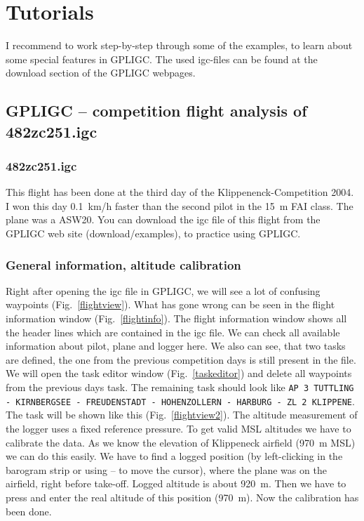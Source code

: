 \section{Tutorials}

I recommend to work step-by-step through some of the examples, to learn about some special features in GPLIGC.
The used igc-files can be found at the download section of the GPLIGC webpages.

\subsection{GPLIGC -- competition flight analysis  of 482zc251.igc}

\subsubsection{482zc251.igc}
This flight has been done at the third day of the Klippenenck-Competition 2004.
I won this day 0.1~km/h faster than the second pilot in the 15~m FAI class. The plane was a ASW20.
You can download the igc file of this flight from the GPLIGC web site (download/examples), to practice using GPLIGC.

\subsubsection{General information, altitude calibration}
Right after opening the igc file in GPLIGC, we will see a lot of confusing waypoints (Fig.~\ref{flightview}).
What has gone wrong can be seen in the flight information window (Fig.~\ref{flightinfo}).
The flight information window shows all the header lines which are contained in the igc file.
We can check all available information about pilot, plane and logger here.
We also can see, that two tasks are defined, the one from the previous competition days is still present in the file.
We will open the task editor window (Fig.~\ref{taskeditor}) and delete all waypoints from the previous days task.
The remaining task should look like \texttt{AP 3 TUTTLING - KIRNBERGSEE - FREUDENSTADT - HOHENZOLLERN - HARBURG - ZL 2 KLIPPENE}.
The task will be shown like this (Fig.~\ref{flightview2}).
The altitude measurement of the logger uses a fixed reference pressure.
To get valid MSL altitudes we have to calibrate the data.
As we know the elevation of Klippeneck airfield (970~m MSL) we can do this easily.
We have to find a logged position (by left-clicking in the barogram strip or using -- to move the cursor),
where the plane was on the airfield, right before take-off. Logged altitude is about 920~m.
Then we have to press  and enter the real altitude of this position (970~m).
Now the calibration has been done.


